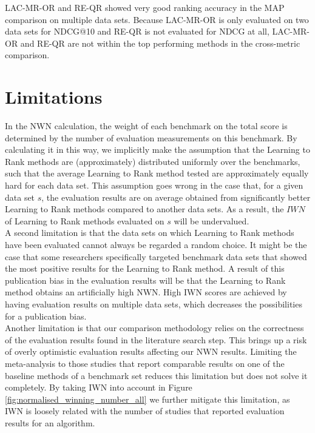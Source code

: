 LAC-MR-OR and RE-QR showed very good ranking accuracy in the \ac{MAP} comparison on multiple data sets. Because LAC-MR-OR is only evaluated on two data sets for \ac{NDCG}@10 and RE-QR is not evaluated for \ac{NDCG} at all, LAC-MR-OR and RE-QR are not within the top performing methods in the cross-metric comparison. 

\section{Limitations}
In the \ac{NWN} calculation, the weight of each benchmark on the total score is determined by the number of evaluation measurements on this benchmark. By calculating it in this way, we implicitly make the assumption that the Learning to Rank methods are (approximately) distributed uniformly over the benchmarks, such that the average Learning to Rank method tested are approximately equally hard for each data set. This assumption goes wrong in the case that, for a given data set $s$, the evaluation results are on average obtained from significantly better Learning to Rank methods compared to another data sets. As a result, the $IWN$ of Learning to Rank methods evaluated on $s$ will be undervalued.\\

A second limitation is that the data sets on which Learning to Rank methods have been evaluated cannot always be regarded a random choice. It might be the case that some researchers specifically targeted benchmark data sets that showed the most positive results for the Learning to Rank method. A result of this publication bias in the evaluation results will be that the Learning to Rank method obtains an artificially high \ac{NWN}. High \ac{IWN} scores are achieved by having evaluation results on multiple data sets, which decreases the possibilities for a publication bias.\\

Another limitation is that our comparison methodology relies on the correctness of the evaluation results found in the literature search step. This brings up a risk of overly optimistic evaluation results affecting our \ac{NWN} results. Limiting the meta-analysis to those studies that report comparable results on one of the baseline methods of a benchmark set reduces this limitation but does not solve it completely. By taking \ac{IWN} into account in Figure \ref{fig:normalised_winning_number_all} we further mitigate this limitation, as \ac{IWN} is loosely related with the number of studies that reported evaluation results for an algorithm.\\

